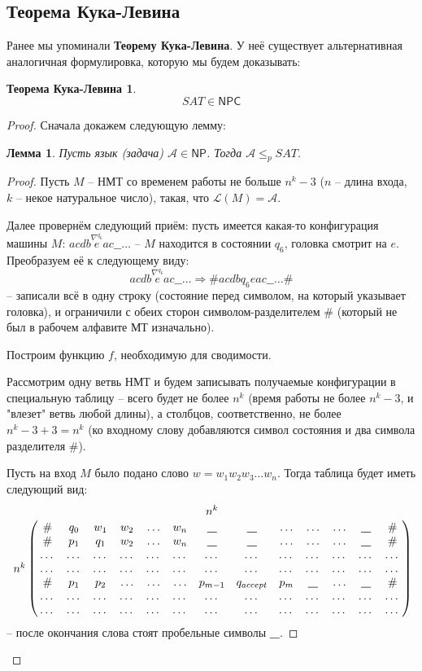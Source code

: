 \documentclass[a4paper,12pt]{article}
\newcommand{\NPclass}{\mathsf{NP}}
\newcommand{\NPCclass}{\mathsf{NPC}}
\newtheorem*{lemma}{Лемма}
\newtheorem*{kuk}{Теорема Кука-Левина}
\renewcommand{\L}{\mathscr{L}}
\begin{document}
\subsection{Теорема Кука-Левина}
Ранее мы упоминали \textbf{Теорему Кука-Левина}. У неё существует альтернативная аналогичная формулировка, которую мы будем доказывать:
\begin{kuk}
\[SAT \in \NPCclass\]
\end{kuk}
\begin{proof}
    Сначала докажем следующую лемму:
    \begin{lemma}
    Пусть язык (задача) $\mathscr{A} \in \NPclass$. Тогда $\mathscr{A} \leqslant_p SAT$.
    \end{lemma}
    \begin{proof}
        Пусть $M$ -- НМТ со временем работы не больше $n^k - 3$ ($n$ -- длина входа, $k$ -- некое натуральное число), такая, что $\L(M) = \mathscr{A}$.
        
        Далее провернём следующий приём: пусть имеется какая-то конфигурация машины $M$: $acdb\overset{\nabla^{q_6}}{e}ac\textbf{\_}\textbf{\_}\ldots$ -- $M$ находится в состоянии $q_6$, головка смотрит на $e$. Преобразуем её к следующему виду:
        \[acdb\overset{\nabla^{q_6}}{e}ac\textbf{\_}\textbf{\_}\ldots \Longrightarrow \#acdbq_6eac\textbf{\_}\textbf{\_}\ldots\#\] -- записали всё в одну строку (состояние перед символом, на который указывает головка), и ограничили с обеих сторон символом-разделителем $\#$ (который не был в рабочем алфавите МТ изначально).
        
        Построим функцию $f$, необходимую для сводимости. 
        
        Рассмотрим одну ветвь НМТ и будем записывать получаемые конфигурации в специальную таблицу -- всего будет не более $n^k$ (время работы не более $n^k - 3$, и "влезет" ветвь любой длины), а столбцов, соответственно, не более $n^k - 3 + 3 = n^k$ (ко входному слову добавляются символ состояния и два символа разделителя $\#$).
        
        Пусть на вход $M$ было подано слово $w = w_1w_2w_3\ldots w_n$. Тогда таблица будет иметь следующий вид:
        \[ \bordermatrix{       
                & & & & & & & n^k & & & & & \cr
                & \# & q_0 & w_1 & w_2 &\ldots&w_n &\textbf{\_} &\textbf{\_} &\ldots&\ldots&\ldots &\textbf{\_} &\# \cr
                & \# & p_1 & q_1 & w_2 &\ldots&w_n &\textbf{\_} &\textbf{\_} &\ldots&\ldots&\ldots &\textbf{\_} &\# \cr
                &\dots &\dots &\dots &\dots &\dots &\dots &\dots &\dots &\dots &\dots&\dots&\dots &\dots \cr
            n^k &\dots &\dots &\dots &\dots &\dots &\dots &\dots &\dots &\dots&\dots&\dots         &\dots &\dots \cr
                &\#& p_1 & p_2 &\ldots&\ldots&\ldots& p_{m - 1} &q_{accept} &p_{m} &\textbf{\_} &\ldots &\textbf{\_} &\#  \cr
                &\dots &\dots &\dots &\dots &\dots &\dots &\dots &\dots&\dots&\dots&\dots &\dots &\dots \cr
                &\dots &\dots &\dots &\dots &\dots &\dots &\dots &\dots &\dots&\dots&\dots &\dots &\dots \cr}
        \]-- после окончания слова стоят пробельные символы \textbf{\_}.
        

\end{proof}
\end{proof}
\end{document}
